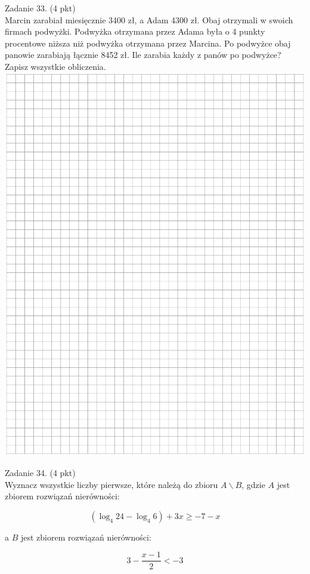 \documentclass[10pt]{article}
\begin{document}
Zadanie 33. (4 pkt)\\
Marcin zarabiał miesięcznie 3400 zł, a Adam 4300 zł. Obaj otrzymali w swoich firmach podwyżki. Podwyżka otrzymana przez Adama była o 4 punkty procentowe niższa niż podwyżka otrzymana przez Marcina. Po podwyżce obaj panowie zarabiają łącznie 8452 zł. Ile zarabia każdy z panów po podwyżce? Zapisz wszystkie obliczenia.\\
\includegraphics[max width=\textwidth, center]{2024_11_21_55bf50695fa934dbe20eg-12}

Zadanie 34. (4 pkt)\\
Wyznacz wszystkie liczby pierwsze, które należą do zbioru \(A \backslash B\), gdzie \(A\) jest zbiorem rozwiązań nierówności:

\[
\left(\log _{4} 24-\log _{4} 6\right)+3 x \geq-7-x
\]

a \(B\) jest zbiorem rozwiązań nierówności:

\[
3-\frac{x-1}{2}<-3
\]
\end{document}
